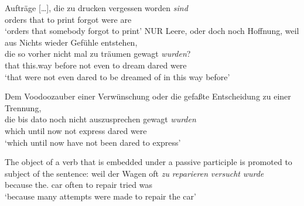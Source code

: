\ex Aufträge [\ldots], die zu drucken vergessen worden \emph{sind}\/\footnotemark\\
    orders   {}        that to print  forgot    were   are\\
\glt `orders that somebody forgot to print'
\ex NUR Leere, oder doch noch Hoffnung, weil aus Nichts wieder Gefühle entstehen,\\
\gll die so vorher nicht mal zu träumen gewagt \emph{wurden}?\footnotemark\\
     that this.way before not even to dream dared were\\
\glt `that were not even dared to be dreamed of in this way before'

\ex Dem Voodoozauber einer Verwünschung oder die gefaßte Entscheidung zu einer Trennung,\\
\gll die bis dato noch nicht auszusprechen gewagt \emph{wurden}\footnotemark\\
     which until now not express dared were\\
\glt `which until now have not been dared to express'
\zl
%

\noindent
The object of a verb that is embedded under a passive participle is promoted to subject of the sentence:
\eal
\ex 
{}
\ex 
\gll weil    der        Wagen oft   \emph{zu} \emph{reparieren} \emph{versucht} \emph{wurde}\\
     because the.\NOM{} car   often to repair     tried    was\\
\glt `because many attempts were made to repair the car'\label{bsp-zu-reparieren-versucht-wurde-two}
\zl

